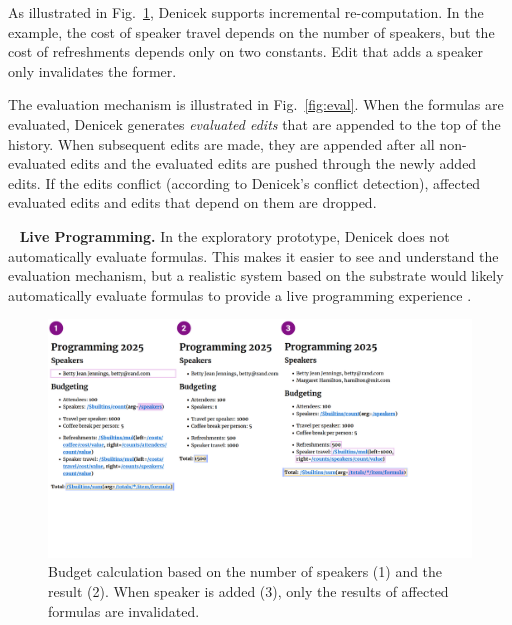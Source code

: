 \documentclass[sigconf,anonymous,screen]{acmart}
\DeclareRobustCommand{\keyideabox}[3]{\begin{tcolorbox}[breakable,
  boxsep=5pt,left=0pt,right=0pt,top=0pt,bottom=0pt,width=\dimexpr\columnwidth\relax,
  colback=gray!20,colframe=gray!20,
  enlarge bottom by=0pt,enlarge top by=0pt,
  arc=0pt,outer arc=0pt]
\lettrine[lraise=0.3]{\LARGE #1}{~}
\small \textbf{#2.} #3
\end{tcolorbox}
}
\begin{document}
As illustrated in Fig.~\ref{fig:incremental}, Denicek supports incremental re-computa\-tion.
In the example, the cost of speaker travel depends on the number of speakers, but the cost
of refreshments depends only on two constants. Edit that adds a speaker only invalidates the
former.

The evaluation mechanism is illustrated in Fig.~\ref{fig:eval}. When the formulas are evaluated,
Denicek generates \emph{evaluated edits} that are appended to the top of the history.
When subsequent edits are made, they are appended after all non-evaluated edits and the
evaluated edits are pushed through the newly added edits. If the edits conflict (according to
Denicek's conflict detection), affected evaluated edits and edits that depend on them are dropped.

\keyideabox{\faRefresh}{Live Programming}{In the exploratory prototype, Denicek does not
automatically evaluate formulas. This makes it easier to see and understand the evaluation
mechanism, but a realistic system based on the substrate would likely automatically evaluate
formulas to provide a live programming experience \cite{petricek-2020-foundations,rein-2019-live}.}

\begin{figure}[t]
  \includegraphics[width=1\columnwidth,clip,trim=0.1cm 5cm 5.1cm 0cm]{fig/incremental.pdf}
  \vspace{-0.5em}
  \caption{Budget calculation based on the number of speakers (1) and the result (2). When speaker
  is added (3), only the results of affected formulas are invalidated.}
  \label{fig:incremental}
\end{figure}
\end{document}
